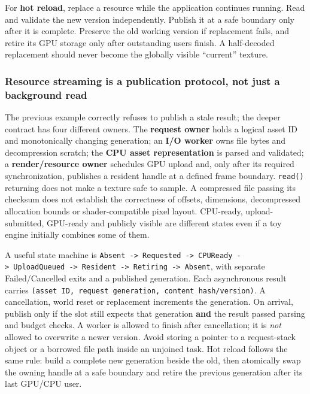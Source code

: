 For \textbf{hot reload}, replace a resource while the application continues running. Read and validate the new version independently. Publish it at a safe boundary only after it is complete. Preserve the old working version if replacement fails, and retire its GPU storage only after outstanding users finish. A half-decoded replacement should never become the globally visible ``current'' texture.

\subsubsection{Resource streaming is a publication protocol, not just a background read}\label{06-engine-ii-ch027-resource-streaming-is-a-publication-protocol-not-just-a-background-read}

\hypertarget{06-engine-ii-ch027-resource-streaming-is-a-publication-protocol-not-just-a-background-read}{}

The previous example correctly refuses to publish a stale result; the deeper contract has four different owners. The \textbf{request owner} holds a logical asset ID and monotonically changing generation; an \textbf{I/O worker} owns file bytes and decompression scratch; the \textbf{CPU asset representation} is parsed and validated; a \textbf{render/resource owner} schedules GPU upload and, only after its required synchronization, publishes a resident handle at a defined frame boundary. \texttt{read()} returning does not make a texture safe to sample. A compressed file passing its checksum does not establish the correctness of offsets, dimensions, decompressed allocation bounds or shader-compatible pixel layout. CPU-ready, upload-submitted, GPU-ready and publicly visible are different states even if a toy engine initially combines some of them.

A useful state machine is \texttt{Absent\ -\textgreater{}\ Requested\ -\textgreater{}\ CPUReady\ -\textgreater{}\ UploadQueued\ -\textgreater{}\ Resident\ -\textgreater{}\ Retiring\ -\textgreater{}\ Absent}, with separate Failed/Cancelled exits and a published generation. Each asynchronous result carries \texttt{(asset\ ID,\ request\ generation,\ content\ hash/version)}. A cancellation, world reset or replacement increments the generation. On arrival, publish only if the slot still expects that generation \textbf{and} the result passed parsing and budget checks. A worker is allowed to finish after cancellation; it is \emph{not} allowed to overwrite a newer version. Avoid storing a pointer to a request-stack object or a borrowed file path inside an unjoined task. Hot reload follows the same rule: build a complete new generation beside the old, then atomically swap the owning handle at a safe boundary and retire the previous generation after its last GPU/CPU user.

